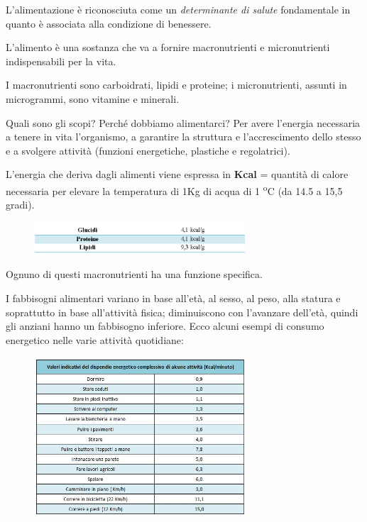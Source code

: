 L'alimentazione è riconosciuta come un \emph{determinante di salute}
fondamentale in quanto è associata alla condizione di benessere.

L'alimento è una sostanza che va a fornire macronutrienti e
micronutrienti indispensabili per la vita.

I macronutrienti sono carboidrati, lipidi e proteine; i micronutrienti,
assunti in microgrammi, sono vitamine e minerali.

Quali sono gli scopi? Perché dobbiamo alimentarci? Per avere l'energia
necessaria a tenere in vita l'organismo, a garantire la struttura e
l'accrescimento dello stesso e a svolgere attività (funzioni
energetiche, plastiche e regolatrici).

L'energia che deriva dagli alimenti viene espressa in \textbf{Kcal} =
quantità di calore necessaria per elevare la temperatura di 1Kg di acqua
di 1 \textsuperscript{o}C (da 14.5 a 15,5 gradi).

\begin{figure}[!ht]
\centering
	\includegraphics[width=0.7\textwidth]{20/image4.png}
	\end{figure}

Ognuno di questi macronutrienti ha una funzione specifica.

I fabbisogni alimentari variano in base all'età, al sesso, al peso, alla
statura e soprattutto in base all'attività fisica; diminuiscono con
l'avanzare dell'età, quindi gli anziani hanno un fabbisogno inferiore.
Ecco alcuni esempi di consumo energetico nelle varie attività
quotidiane:

\begin{figure}[!ht]
\centering
	\includegraphics[width=0.7\textwidth]{20/image5.jpeg}
	\end{figure}

